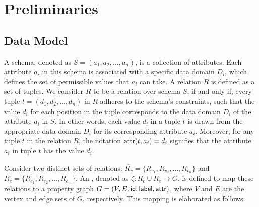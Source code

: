 \section{Preliminaries}
\label{sec:preliminaries}

\subsection{Data Model}
\label{sec:data-model}

A schema, denoted as \(S = (a_1, a_2, \ldots, a_n)\), is a collection of attributes. Each attribute \(a_i\) in this schema is associated with a specific data domain \(D_i\), which defines the set of permissible values that \(a_i\) can take.
A relation \(R\) is defined as a set of tuples. We consider \(R\) to be a relation over schema \(S\), if and only if, every tuple \(t = (d_1, d_2, \ldots, d_n)\) in \(R\) adheres to the schema's constraints, such that the value \(d_i\) for each position in the tuple corresponds to the data domain \(D_i\) of the attribute \(a_i\) in \(S\). In other words, each value \(d_i\) in a tuple \(t\) is drawn from the appropriate data domain \(D_i\) for its corresponding attribute \(a_i\).
Moreover, for any tuple \(t\) in the relation \(R\), the notation \({\mathsf{attr}}(t, a_i) = d_i\) signifies that the attribute \(a_i\) in tuple \(t\) has the value \(d_i\).

Consider two distinct sets of relations: \(\overline{R_v} = \{R_{v_1}, R_{v_2}, \ldots, R_{v_n}\}\) and \(\overline{R_e} = \{R_{e_1}, R_{e_2}, \ldots, R_{e_m}\}\). An \rgmapping, denoted as \(\zeta: R_v \cup R_e \to G\), is defined to map these relations to a property graph \(G = (V, E, {\mathsf{id}}, {\mathsf{label}}, {\mathsf{attr}})\), where \(V\) and \(E\) are the vertex and edge sets of \(G\), respectively. This mapping is elaborated as follows:

